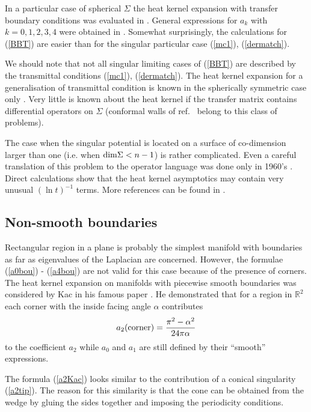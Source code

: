 In a particular case of spherical $\Sigma$ the heat kernel
expansion with transfer boundary conditions was evaluated in 
\cite{Bordag:2001ta}. General expressions for $a_k$ with
$k=0,1,2,3,4$ were obtained in \cite{Gilkey:2002nv}.
Somewhat surprisingly, the calculations for (\ref{BBT})
are easier than for the singular particular case (\ref{mc1}),
(\ref{dermatch}).

We should note that not all singular limiting cases of
(\ref{BBT}) are described by the transmittal conditions
(\ref{mc1}), (\ref{dermatch}). The heat kernel expansion
for a generalisation of transmittal condition is known
in the spherically symmetric case only \cite{Bordag:2001ta}.  
Very little is known about the heat kernel if the transfer
matrix contains differential operators on $\Sigma$ (conformal
walls of ref.\ \cite{Bachas:2001vj} belong to this class
of problems).

The case when the singular potential is located on a surface
of co-dimension larger than one (i.e. when 
${\rm dim}\Sigma <n-1$) is rather complicated. Even a careful
translation of this problem to the operator language
was done only in 1960's \cite{Berezin:1961}. Direct calculations
show \cite{Albeverio:1994,Solodukhin:1997xn} that
the heat kernel asymptotics may contain very unusual $(\ln t)^{-1}$
terms. More references can be found in \cite{Camblong:2001um}.
\subsection{Non-smooth boundaries}\label{s6nsbou}
Rectangular region in a plane is probably the simplest
manifold with boundaries as far as eigenvalues of the Laplacian  
are concerned. However, the formulae (\ref{a0bou}) - 
(\ref{a4bou}) are not valid for this case because of the presence
of corners. The heat kernel expansion on manifolds
with piecewise smooth boundaries was considered by Kac in his
famous paper \cite{Kac:1966}. He demonstrated that for a 
region in $\mathbb{R}^2$ each corner with the inside
facing angle $\alpha$ contributes 
\begin{equation}
a_2({\rm corner})= \frac {\pi^2 -\alpha^2}{24\pi\alpha}
\label{a2Kac}
\end{equation}
to the coefficient $a_2$ while $a_0$ and $a_1$ are still defined
by their ``smooth'' expressions.

The formula (\ref{a2Kac}) looks similar to the contribution of a
conical singularity (\ref{a2tip}). The reason for this similarity
is that the cone can be obtained from the wedge by gluing the sides
together and imposing the periodicity conditions.

